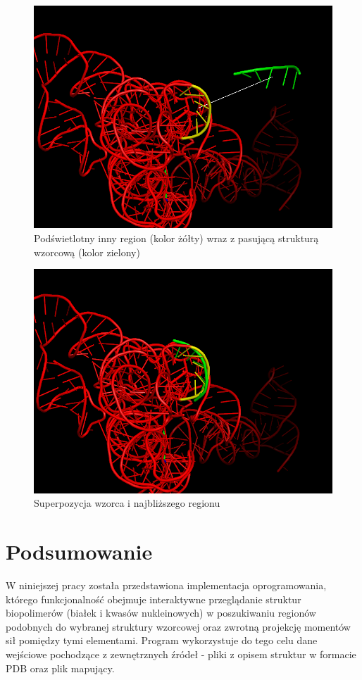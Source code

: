 \documentclass[licencjacka]{pracamgr}
\begin{document}
\begin{figure}[H]
\centering
\includegraphics[scale=0.45,center]{ex2}
\caption{Podświetlotny inny region (kolor żółty) wraz z pasującą strukturą wzorcową (kolor zielony)}
\end{figure}

\begin{figure}[H]
\centering
\includegraphics[scale=0.45,center]{ex2-aligned}
\caption{Superpozycja wzorca i najbliższego regionu}
\end{figure}

\chapter{Podsumowanie}
W niniejszej pracy została przedstawiona implementacja oprogramowania, którego funkcjonalność obejmuje interaktywne przeglądanie struktur biopolimerów (białek i kwasów nukleinowych) w poszukiwaniu regionów podobnych do wybranej struktury wzorcowej oraz zwrotną projekcję momentów sił pomiędzy tymi elementami. Program wykorzystuje do tego celu dane wejściowe pochodzące z zewnętrznych źródeł - pliki z opisem struktur w formacie PDB oraz plik mapujący.
\end{document}
